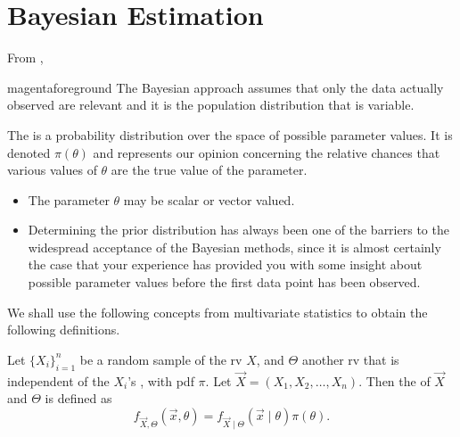 \documentclass[notoc,notitlepage]{tufte-book}
\begin{document}

\section{Bayesian Estimation}%
\label{sec:bayesian_estimation}

From \citealt{klugman2012},
\begin{quotebox}{magenta}{foreground}
  The Bayesian approach assumes that only the data actually observed are
  relevant and it is the population distribution that is variable.
\end{quotebox}

\begin{defn}\label{defn:prior_distribution}
  The  is a probability distribution over the space
  of possible parameter values. It is denoted $\pi(\theta)$ and represents our
  opinion concerning the relative chances that various values of $\theta$ are
  the true value of the parameter.
\end{defn}

\begin{note}
  \begin{itemize}
    \item The parameter $\theta$ may be scalar or vector valued.
    \item Determining the prior distribution has always been one of the barriers
      to the widespread acceptance of the Bayesian methods, since it is almost
      certainly the case that your experience has provided you with some
      insight about possible parameter values before the first data point has
      been observed.
  \end{itemize}
\end{note}

We shall use the following concepts from multivariate statistics to obtain the
following definitions.

\begin{defn}\label{defn:joint_distribution}
  Let $\{ X_i \}_{i=1}^{n}$ be a random sample of the rv $X$, and $\Theta$ 
  another rv that is independent of the $X_i$'s , with pdf $\pi$. Let
  $\vec{X} = (X_1, X_2, \ldots, X_n)$. Then the  of
  $\vec{X}$ and $\Theta$ is defined as
  \begin{equation*}
    f_{\vec{X}, \Theta}(\vec{x}, \theta) = f_{\vec{X} \mid \Theta}(\vec{x} \mid
    \theta) \pi(\theta).
  \end{equation*}
\end{defn}
\end{document}
